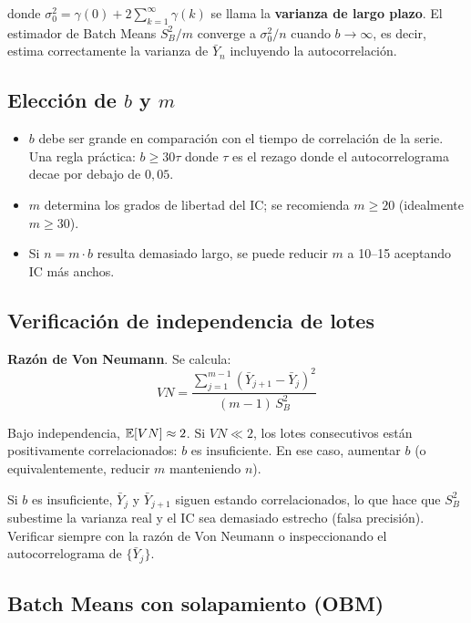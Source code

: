 \documentclass[11pt, letterpaper]{article}
\begin{document}
donde $\sigma_0^2 = \gamma(0) + 2\sum_{k=1}^{\infty}\gamma(k)$ se llama la \textbf{varianza de largo plazo}. El estimador de Batch Means $S_B^2/m$ converge a $\sigma_0^2/n$ cuando $b \to \infty$, es decir, estima correctamente la varianza de $\bar Y_n$ incluyendo la autocorrelación.

\subsection{Elección de $b$ y $m$}

\begin{itemize}
    \item $b$ debe ser grande en comparación con el tiempo de correlación de la serie. Una regla práctica: $b \ge 30\tau$ donde $\tau$ es el rezago donde el autocorrelograma decae por debajo de $0{,}05$.
    \item $m$ determina los grados de libertad del IC; se recomienda $m \ge 20$ (idealmente $m \ge 30$).
    \item Si $n = m \cdot b$ resulta demasiado largo, se puede reducir $m$ a 10--15 aceptando IC más anchos.
\end{itemize}

\subsection{Verificación de independencia de lotes}

\textbf{Razón de Von Neumann}. Se calcula:
\[
VN = \frac{\sum_{j=1}^{m-1}(\bar Y_{j+1} - \bar Y_j)^2}{(m-1)\,S_B^2}
\]

Bajo independencia, $\mathbb{E}[VN] \approx 2$. Si $VN \ll 2$, los lotes consecutivos están positivamente correlacionados: $b$ es insuficiente. En ese caso, aumentar $b$ (o equivalentemente, reducir $m$ manteniendo $n$).

\begin{alertabox}
Si $b$ es insuficiente, $\bar Y_j$ y $\bar Y_{j+1}$ siguen estando correlacionados, lo que hace que $S_B^2$ subestime la varianza real y el IC sea demasiado estrecho (falsa precisión). Verificar siempre con la razón de Von Neumann o inspeccionando el autocorrelograma de $\{\bar Y_j\}$.
\end{alertabox}

\subsection{Batch Means con solapamiento (OBM)}
\end{document}

